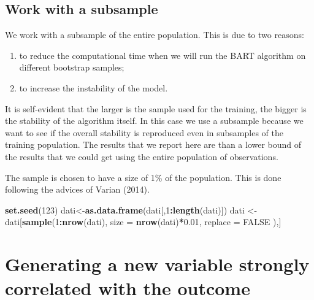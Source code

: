\documentclass[]{article}
\newenvironment{Shaded}{\begin{snugshade}}{\end{snugshade}}
\newcommand{\DataTypeTok}[1]{\textcolor[rgb]{0.13,0.29,0.53}{#1}}
\newcommand{\DecValTok}[1]{\textcolor[rgb]{0.00,0.00,0.81}{#1}}
\newcommand{\FloatTok}[1]{\textcolor[rgb]{0.00,0.00,0.81}{#1}}
\newcommand{\KeywordTok}[1]{\textcolor[rgb]{0.13,0.29,0.53}{\textbf{#1}}}
\newcommand{\NormalTok}[1]{#1}
\newcommand{\OperatorTok}[1]{\textcolor[rgb]{0.81,0.36,0.00}{\textbf{#1}}}
\newcommand{\OtherTok}[1]{\textcolor[rgb]{0.56,0.35,0.01}{#1}}
\newcommand{\StringTok}[1]{\textcolor[rgb]{0.31,0.60,0.02}{#1}}
\begin{document}
\hypertarget{work-with-a-subsample}{%
\subsection{Work with a subsample}\label{work-with-a-subsample}}

We work with a subsample of the entire population. This is due to two
reasons:

\begin{enumerate}
  \item to reduce the computational time when we will run the BART algorithm on different bootstrap samples;
  \item to increase the instability of the model.
\end{enumerate}

\par

It is self-evident that the larger is the sample used for the training,
the bigger is the stability of the algorithm itself. In this case we use
a subsample because we want to see if the overall stability is
reproduced even in subsamples of the training population. The results
that we report here are than a lower bound of the results that we could
get using the entire population of observations.

\par

The sample is chosen to have a size of 1\% of the population. This is
done following the advices of Varian (2014).

\begin{Shaded}
\begin{Highlighting}[]
\KeywordTok{set.seed}\NormalTok{(}\DecValTok{123}\NormalTok{)}
\NormalTok{dati<-}\KeywordTok{as.data.frame}\NormalTok{(dati[,}\DecValTok{1}\OperatorTok{:}\KeywordTok{length}\NormalTok{(dati)])}
\NormalTok{dati <-}\StringTok{ }\NormalTok{dati[}\KeywordTok{sample}\NormalTok{(}\DecValTok{1}\OperatorTok{:}\KeywordTok{nrow}\NormalTok{(dati), }\DataTypeTok{size =} \KeywordTok{nrow}\NormalTok{(dati)}\OperatorTok{*}\FloatTok{0.01}\NormalTok{, }\DataTypeTok{replace =} \OtherTok{FALSE}\NormalTok{ ),]}
\end{Highlighting}
\end{Shaded}

\hypertarget{generating-a-new-variable-strongly-correlated-with-the-outcome}{%
\section{Generating a new variable strongly correlated with the
outcome}\label{generating-a-new-variable-strongly-correlated-with-the-outcome}}
\end{document}
